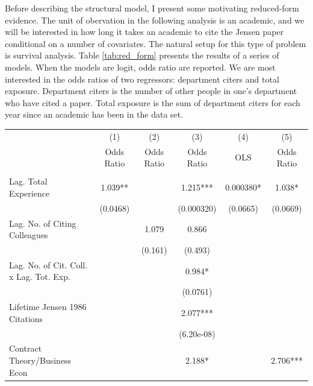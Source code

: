 \documentclass[]{article}
\begin{document}
Before describing the structural model, I present some motivating reduced-form evidence.  The unit of obervation in the following analysis is an academic, and we will be interested in how long it takes an academic to cite the Jensen paper conditional on a number of covariates.  The natural setup for this type of problem is survival analysis.  Table \ref{tab:red_form} presents the results of a series of models.  When the models are logit, odds ratio are reported.  We are most interested in the odds ratios of two regressors: department citers and total exposure.  Department citers is the number of other people in one's department who have cited a paper.  Total exposure is the sum of department citers for each year since an academic has been in the data set.
\begin{table}
    \centering
    \begin{tabular}{lccccc} \hline
                                            & (1)        & (2)        & (3)         & (4)       & (5)        \\
                                            & Odds Ratio & Odds Ratio & Odds Ratio  & OLS       & Odds Ratio \\ \hline
                                            &            &            &             &           &            \\
    Lag. Total Experience                   & 1.039**    &            & 1.215***    & 0.000380* & 1.038*     \\
                                            & (0.0468)   &            & (0.000320)  & (0.0665)  & (0.0669)   \\
    Lag. No. of Citing Colleagues           &            & 1.079      & 0.866       &           &            \\
                                            &            & (0.161)    & (0.493)     &           &            \\
    Lag. No. of Cit. Coll. x Lag. Tot. Exp. &            &            & 0.984*      &           &            \\
                                            &            &            & (0.0761)    &           &            \\
    Lifetime Jensen 1986 Citations          &            &            & 2.077***    &           &            \\
                                            &            &            & (6.20e-08)  &           &            \\
    Contract Theory/Business Econ           &            &            & 2.188*      &           & 2.706***   \\

\end{tabular}
\end{table}
\end{document}
